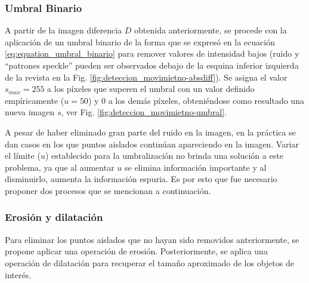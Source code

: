 \subsubsection{Umbral Binario}
\label{subsub_ymbral}
A partir de la imagen diferencia $D$ obtenida anteriormente, se procede con la aplicación de un umbral binario de la forma que se expresó en la ecuación \eqref{eq:equation_umbral_binario} para remover valores de intensidad bajos (ruido y ``patrones speckle'' pueden ser observados debajo de la esquina inferior izquierda de la revista en la Fig. \ref{fig:deteccion_movimietno-absdiff}). Se asigna el valor $s_{max}=255$ a los píxeles que superen el umbral con un valor definido empíricamente ($u=50$) y $0$ a los demás píxeles, obteniéndose como resultado una nueva imagen $s$, ver Fig. \ref{fig:deteccion_movimietno-umbral}.

A pesar de haber eliminado gran parte del ruido en la imagen, en la práctica se dan casos en los que puntos aislados continúan apareciendo en la imagen. Variar el límite ($u$) establecido para la umbralización no brinda una solución a este problema, ya que al aumentar $u$ se elimina información importante y al disminuirlo, aumenta la información espuria. Es por esto que fue necesario proponer dos procesos que se mencionan a continuación.
\subsubsection{Erosión y dilatación}
Para eliminar los puntos aislados que no hayan sido removidos anteriormente, se propone aplicar una operación de erosión. Posteriormente, se aplica una operación de dilatación para recuperar el tamaño aproximado de los objetos de interés.

